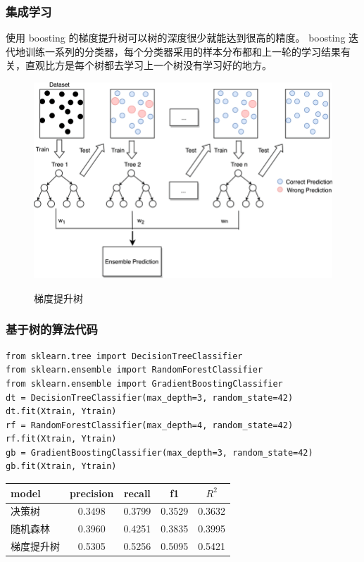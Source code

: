 \documentclass{ctexbeamer}
\begin{document}
\begin{frame}
    \frametitle{集成学习}
    使用 boosting 的梯度提升树可以树的深度很少就能达到很高的精度。
    boosting 迭代地训练一系列的分类器，每个分类器采用的样本分布都和上一轮的学习结果有关，直观比方是每个树都去学习上一个树没有学习好的地方。
    \begin{center}
        \begin{figure}
            \includegraphics[width=0.6\linewidth]{../lib/boosting.png}
            \label{boosting}
            \caption{梯度提升树}
        \end{figure}
    \end{center}
\end{frame}
\begin{frame}[fragile]
    \frametitle{基于树的算法代码}
    \begin{verbatim}
from sklearn.tree import DecisionTreeClassifier
from sklearn.ensemble import RandomForestClassifier
from sklearn.ensemble import GradientBoostingClassifier
dt = DecisionTreeClassifier(max_depth=3, random_state=42)
dt.fit(Xtrain, Ytrain)
rf = RandomForestClassifier(max_depth=4, random_state=42)
rf.fit(Xtrain, Ytrain)
gb = GradientBoostingClassifier(max_depth=3, random_state=42)
gb.fit(Xtrain, Ytrain)
    \end{verbatim}
    \begin{center}
        \begin{tabular}{l|cccc}
            model & precision & recall & f1     & \(R^2\) \\ \hline
            决策树   & 0.3498    & 0.3799 & 0.3529 & 0.3632  \\
            随机森林  & 0.3960    & 0.4251 & 0.3835 & 0.3995  \\
            梯度提升树 & 0.5305    & 0.5256 & 0.5095 & 0.5421  \\
        \end{tabular}
    \end{center}
\end{frame}
\end{document}
